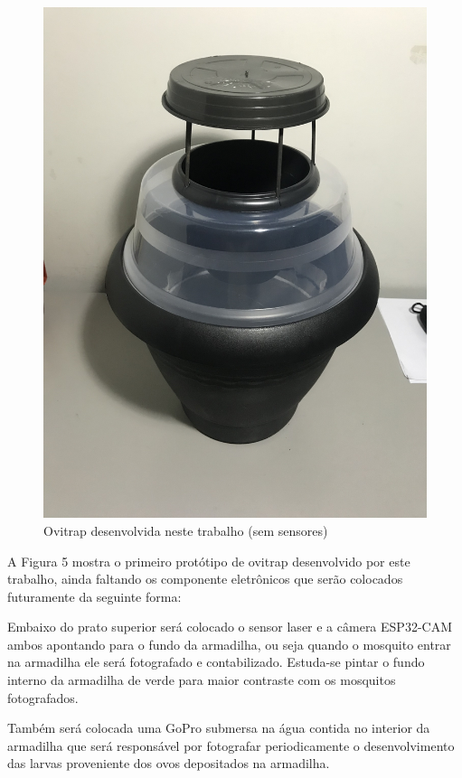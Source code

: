 \documentclass[
	12pt,				%
	openright,			%
	oneside,			%
	a4paper,			%
	chapter=TITLE,		%
	english,			%
	brazil				%
	]{abntex2}
\begin{document}
\begin{figure}[H]
\centering
\includegraphics[scale=0.09]{imagens/prototipo1_2.jpg}
\caption{Ovitrap desenvolvida neste trabalho (sem sensores)}
\end{figure}

A Figura 5 mostra o primeiro protótipo de ovitrap desenvolvido por este trabalho, ainda faltando os componente eletrônicos que serão colocados futuramente da seguinte forma:

Embaixo do prato superior será colocado o sensor laser e a câmera ESP32-CAM ambos apontando para o fundo da armadilha, ou seja quando o mosquito entrar na armadilha ele será fotografado e contabilizado. Estuda-se pintar o fundo interno da armadilha de verde para maior contraste com os mosquitos fotografados. 

Também será colocada uma GoPro submersa na água contida no interior da armadilha que será responsável por fotografar periodicamente o desenvolvimento das larvas proveniente dos ovos depositados na armadilha.
\end{document}
